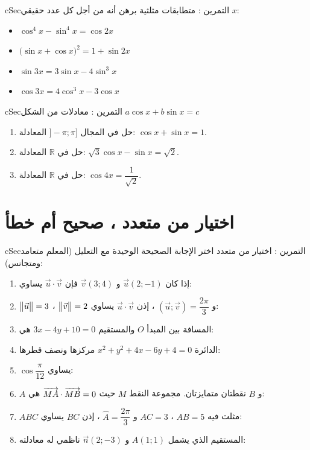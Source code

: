 \documentclass[12pt,a4paper]{article}
\newenvironment{BOX}[2]{\begin{otherlanguage}{english}\begin{arbox}{#1}{#2}}{\end{arbox}\end{otherlanguage}}
\newcounter{exo}
\newenvironment{tamrin}[1]{\stepcounter{exo}\begin{BOX}{cSec}{التمرين \theexo: #1}}{\end{BOX}}
\newcommand{\R}{\mathbb{R}}
\newenvironment{sq}{\begin{itemize}[leftmargin=2.4em,itemsep=3pt]}{\end{itemize}}
\newcommand{\qa}{\item[(أ)]}\newcommand{\qb}{\item[(ب)]}\newcommand{\qc}{\item[(جـ)]}\newcommand{\qd}{\item[(د)]}\newcommand{\qe}{\item[(هـ)]}
\begin{document}
\begin{tamrin}{متطابقات مثلثية}
برهن أنه من أجل كل عدد حقيقي $x$:
\begin{sq}
\qa $\cos^4x-\sin^4x=\cos2x$
\qb $\big(\sin x+\cos x\big)^2=1+\sin2x$
\qc $\sin3x=3\sin x-4\sin^3x$
\qd $\cos3x=4\cos^3x-3\cos x$
\end{sq}
\end{tamrin}

\begin{tamrin}{معادلات من الشكل $a\cos x+b\sin x=c$}
\begin{enumerate}
\item حل في المجال $]-\pi;\pi]$ المعادلة: $\cos x+\sin x=1$.
\item حل في $\R$ المعادلة: $\sqrt3\cos x-\sin x=\sqrt2$.
\item حل في $\R$ المعادلة: $\cos4x=\dfrac{1}{\sqrt2}$.
\end{enumerate}
\end{tamrin}

\section{اختيار من متعدد ، صحيح أم خطأ}
\begin{tamrin}{اختيار من متعدد}
اختر الإجابة الصحيحة الوحيدة مع التعليل (المعلم متعامد ومتجانس):
\begin{enumerate}
\item إذا كان $\vec u(2;-1)$ و $\vec v(3;4)$ فإن $\vec u\cdot\vec v$ يساوي:
\item $\big\|\vec u\big\|=3$ ، $\big\|\vec v\big\|=2$ و $(\vec u;\vec v)=\dfrac{2\pi}{3}$ ، إذن $\vec u\cdot\vec v$ يساوي:
\item المسافة بين المبدأ $O$ والمستقيم $3x-4y+10=0$ هي:
\item الدائرة $x^2+y^2+4x-6y+4=0$ مركزها ونصف قطرها:
\item $\cos\dfrac{\pi}{12}$ يساوي:
\item $A$ و $B$ نقطتان متمايزتان. مجموعة النقط $M$ حيث $\overrightarrow{MA}\cdot\overrightarrow{MB}=0$ هي:
\item $ABC$ مثلث فيه $AB=5$ ، $AC=3$ و $\widehat{A}=\dfrac{2\pi}{3}$ ، إذن $BC$ يساوي:
\item المستقيم الذي يشمل $A(1;1)$ و $\vec n(2;-3)$ ناظمي له معادلته:
\end{enumerate}
\end{tamrin}
\end{document}
